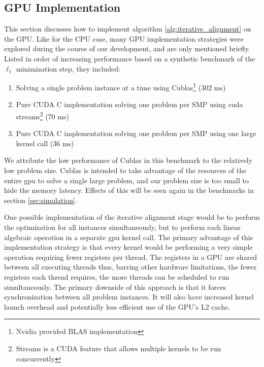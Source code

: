 \documentclass[10pt,twocolumn,letterpaper]{article}
\begin{document}
\subsection{GPU Implementation}
\label{sec:alignment_implementation_gpu}

This section discusses how to implement algorithm
\eqref{alg:iterative_alignment} on the GPU.  Like for the CPU case, many GPU
implementation strategies were explored during the course of our development,
and are only mentioned briefly.  Listed in order of increasing performance
based on a synthetic benchmark of the $\ell_1$ minimization step, they
included:
\begin{enumerate}
\item Solving a single problem instance at a time using Cublas\footnote{Nvidia provided BLAS implementation} (302 ms)
\item Pure CUDA C implementation solving one problem per SMP using cuda streams\footnote{Streams is a CUDA feature that allows multiple
kernels to be run concurrently} (70 ms)
\item Pure CUDA C implementation solving one problem per SMP using one large kernel call (36 ms)
\end{enumerate}

We attribute the low performance of Cublas in this benchmark to the relatively
low problem size. Cublas is intended to take advantage of the resources of the
entire gpu to solve a single large problem, and our problem size is too small
to hide the memory latency.  Effects of this will be seen again in the
benchmarks in section \ref{sec:simulation}.

One possible implementation of the iterative alignment stage would be to
perform the optimization for all instances simultaneously, but to perform each
linear algebraic operation in a separate gpu kernel call.  The primary
advantage of this implementation strategy is that every kernel would be
performing a very simple operation requiring fewer registers per thread.  The
registers in a GPU are shared between all executing threads thus, barring other
hardware limitations, the fewer registers each thread requires, the more
threads can be scheduled to run simultaneously.  The primary downside of this
approach is that it forces synchronization between all problem instances.  It will
also have increased kernel launch overhead and potentially less efficient use of
the GPU's L2 cache.
\end{document}
